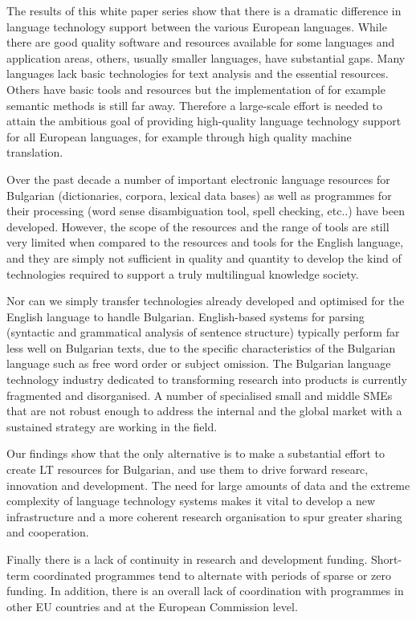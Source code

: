 \documentclass[]{../../metanetpaper}
\begin{document}
\begin{multicols}{2}
The results of this white paper series show that there is a dramatic difference in language technology support between the various European languages. While there are good quality software and resources available for some languages and application areas, others, usually smaller languages, have substantial gaps. Many languages lack basic technologies for text analysis and the essential resources. Others have basic tools and resources but the implementation of for example semantic methods is still far away. Therefore a large-scale effort is needed to attain the ambitious goal of providing high-quality language technology support for all European languages, for example through high quality machine translation. 

Over the past decade a number of important electronic language resources for Bulgarian (dictionaries, corpora, lexical data bases) as well as programmes for their processing (word sense disambiguation tool, spell checking, etc..) have been developed. However, the scope of the resources and the range of tools are still very limited when compared to the resources and tools for the English language, and they are simply not sufficient in quality and quantity to develop the kind of technologies required to support a truly multilingual knowledge society.
\columnbreak

Nor can we simply transfer technologies already developed and optimised for the English language to handle Bulgarian. English-based systems for parsing (syntactic and grammatical analysis of sentence structure) typically perform far less well on Bulgarian texts, due to the specific characteristics of the Bulgarian language such as free word order or subject omission.
The Bulgarian language technology industry dedicated to transforming research into products is currently fragmented and disorganised. A number of specialised small and middle SMEs that are not robust enough to address the internal and the global market with a sustained strategy are working in the field.

Our findings show that the only alternative is to make a substantial effort to create LT resources for Bulgarian, and use them to drive forward researc, innovation and development. The need for large amounts of data and the extreme complexity of language technology systems makes it vital to develop a new infrastructure and a more coherent research organisation to spur greater sharing and cooperation.

Finally there is a lack of continuity in research and development funding. Short-term coordinated programmes tend to alternate with periods of sparse or zero funding. In addition, there is an overall lack of coordination with programmes in other EU countries and at the European Commission level.


\end{multicols}
\end{document}
